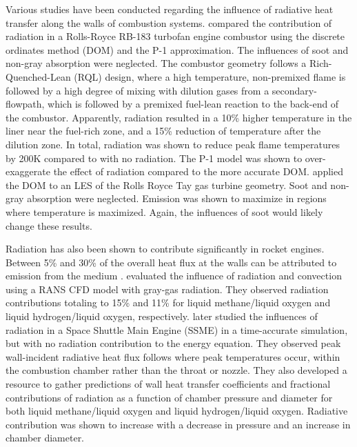 Various studies have been conducted regarding the influence of radiative heat transfer along the walls of combustion systems. \citet{Gamil2020AssessmentChamber} compared the contribution of radiation in a Rolls-Royce RB-183 turbofan engine combustor using the discrete ordinates method (DOM) and the P-1 approximation. The influences of soot and non-gray absorption were neglected.
The combustor geometry follows a Rich-Quenched-Lean (RQL) design, where a high temperature, non-premixed flame is followed by a high degree of mixing with dilution gases from a secondary-flowpath, which is followed by a premixed fuel-lean reaction to the back-end of the combustor.
Apparently, radiation resulted in a 10\% higher temperature in the liner near the fuel-rich zone, and a 15\% reduction of temperature after the dilution zone.
In total, radiation was shown to reduce peak flame temperatures by 200K compared to with no radiation.
The P-1 model was shown to over-exaggerate the effect of radiation compared to the more accurate DOM.
\citet{Paul2006RadiativeCombustor} applied the DOM to an LES of the Rolls Royce Tay gas turbine geometry. Soot and non-gray absorption were neglected. Emission was shown to maximize in regions where temperature is maximized. Again, the influences of soot would likely change these results.

Radiation has also been shown to contribute significantly in rocket engines. Between 5\% and 30\% of the overall heat flux at the walls can be attributed to emission from the medium \cite{Johnson2021AnalysisMethod,Sutton2001RocketElements,Naraghi2005ModelingEngines,Pizzarelli2021OverviewChambers}. \citet{Leccese2018ConvectiveChambers} evaluated the influence of radiation and convection using a RANS CFD model with gray-gas radiation. 
They observed radiation contributions totaling to 15\% and 11\% for liquid methane/liquid oxygen and liquid hydrogen/liquid oxygen, respectively.
\citet{Leccese2019NumericalChambers} later studied the influences of radiation in a Space Shuttle Main Engine (SSME) in a time-accurate simulation, but with no radiation contribution to the energy equation.
They observed peak wall-incident radiative heat flux follows where peak temperatures occur, within the combustion chamber rather than the throat or nozzle. They also developed a resource to gather predictions of wall heat transfer coefficients and fractional contributions of radiation as a function of chamber pressure and diameter for both liquid methane/liquid oxygen and liquid hydrogen/liquid oxygen.
Radiative contribution was shown to increase with a decrease in pressure and an increase in chamber diameter.

